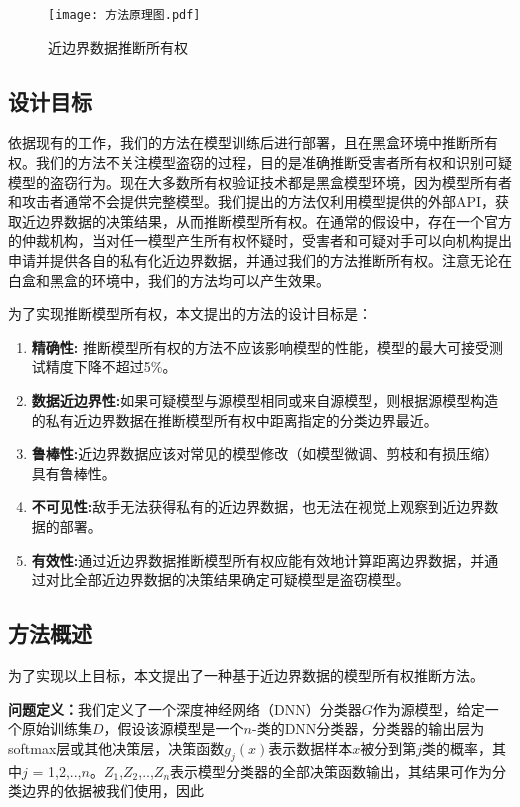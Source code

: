 \begin{figure}[htbp]%
	\centering
	\texttt{[image: 方法原理图.pdf]}
	\setlength{\abovecaptionskip}{5mm} %
	\caption{近边界数据推断所有权}
	\label{方法原理图}
\end {figure}

\subsection{设计目标}

依据现有的工作，我们的方法在模型训练后进行部署，且在黑盒环境中推断所有权。我们的方法不关注模型盗窃的过程，目的是准确推断受害者所有权和识别可疑模型的盗窃行为。现在大多数所有权验证技术都是黑盒模型环境，因为模型所有者和攻击者通常不会提供完整模型。我们提出的方法仅利用模型提供的外部API，获取近边界数据的决策结果，从而推断模型所有权。在通常的假设中，存在一个官方的仲裁机构，当对任一模型产生所有权怀疑时，受害者和可疑对手可以向机构提出申请并提供各自的私有化近边界数据，并通过我们的方法推断所有权。注意无论在白盒和黑盒的环境中，我们的方法均可以产生效果。

为了实现推断模型所有权，本文提出的方法的设计目标是：
\begin{enumerate}
	\renewcommand{\labelenumi}{\theenumi)}
	\item \textbf{精确性:} 推断模型所有权的方法不应该影响模型的性能，模型的最大可接受测试精度下降不超过5\%。
	\item \textbf{数据近边界性:}如果可疑模型与源模型相同或来自源模型，则根据源模型构造的私有近边界数据在推断模型所有权中距离指定的分类边界最近。
	\item \textbf{鲁棒性:}近边界数据应该对常见的模型修改（如模型微调、剪枝和有损压缩）具有鲁棒性。
	\item \textbf{不可见性:}敌手无法获得私有的近边界数据，也无法在视觉上观察到近边界数据的部署。
	\item \textbf{有效性:}通过近边界数据推断模型所有权应能有效地计算距离边界数据，并通过对比全部近边界数据的决策结果确定可疑模型是盗窃模型。
\end{enumerate}

\subsection{方法概述}

为了实现以上目标，本文提出了一种基于近边界数据的模型所有权推断方法。

\noindent\textbf{问题定义：}我们定义了一个深度神经网络（DNN）分类器$G$作为源模型，给定一个原始训练集$D$，假设该源模型是一个$n$-类的DNN分类器，分类器的输出层为softmax层或其他决策层，决策函数$g_j(x)$表示数据样本$x$被分到第$j$类的概率，其中$j$ = 1,2,..,$n$。$Z_1$,$Z_2$,..,$Z_n$表示模型分类器的全部决策函数输出，其结果可作为分类边界的依据被我们使用，因此

